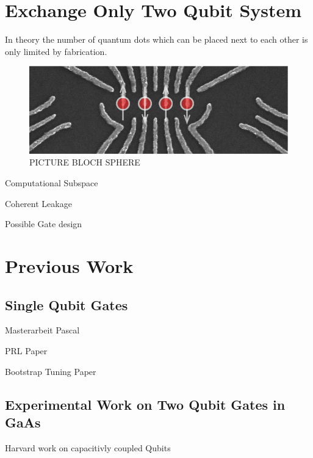 \section{Exchange Only Two Qubit System}
In theory the number of quantum dots which can be placed next to each other is only limited by fabrication. 

\begin{figure}[htbp]\centering
     \centering
     \includegraphics[width=.5\textwidth]{./pictures/gl005_SEM_electrons_small}
     \caption{PICTURE BLOCH SPHERE}
     \label{fig:controlcycle}
 \end{figure}
 
Computational Subspace

Coherent Leakage

Possible Gate design



\section{Previous Work}
\subsection{Single Qubit Gates}

Masterarbeit Pascal

PRL Paper

Bootstrap Tuning Paper

\subsection{Experimental Work on Two Qubit Gates in GaAs}

Harvard work on capacitivly coupled Qubits




